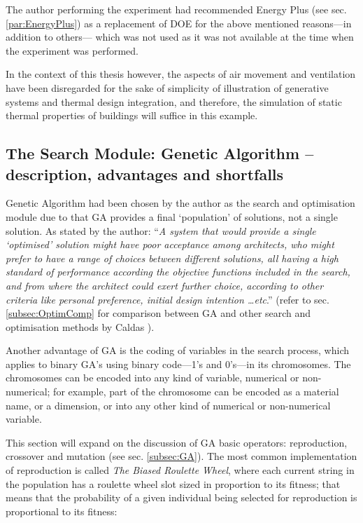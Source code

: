 The author performing the experiment had recommended Energy Plus (see sec. \ref{par:EnergyPlus}) as a replacement of DOE for the above mentioned reasons---in addition to others--- which was not used as it was not available at the time when the experiment was performed.

In the context of this thesis however, the aspects of air movement and ventilation have been disregarded for the sake of simplicity of illustration of generative systems and thermal design integration, and therefore, the simulation of static thermal properties of buildings will suffice in this example.

\subsection{The Search Module: Genetic Algorithm -- description, advantages and shortfalls}

\label{subsec:GA2}
Genetic Algorithm had been chosen by the author as the search and optimisation module due to that GA provides a final `population' of solutions, not a single solution. As stated by the author: ``\emph{A system that would provide a single `optimised' solution might have poor acceptance among architects, who might prefer to have a range of choices between different solutions, all having a high standard of performance according the objective functions included in the search, and from where the architect could exert further choice, according to other criteria like personal preference, initial design intention \ldots etc}.'' (refer to sec. \ref{subsec:OptimComp} for comparison between GA and other search and optimisation methods by Caldas \cite{caldas01}).

Another advantage of GA is the coding of variables in the search process, which applies to binary GA's using binary code---1's and 0's---in its chromosomes. The chromosomes can be encoded into any kind of variable, numerical or non-numerical; for example, part of the chromosome can be encoded as a material name, or a dimension, or into any other kind of numerical or non-numerical variable.

This section will expand on the discussion of GA basic operators: reproduction, crossover and mutation (see sec. \ref{subsec:GA}). The most common implementation of reproduction is called \emph{The Biased Roulette Wheel}, where each current string in the population has a roulette wheel slot sized in proportion to its fitness; that means that the probability of a given individual being selected for reproduction is proportional to its fitness:

